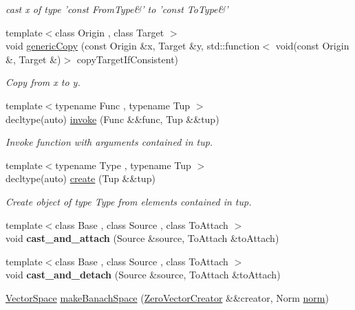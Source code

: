 \begin{DoxyCompactItemize}
\begin{DoxyCompactList}\small\item\em cast x of type 'const From\-Type\&' to 'const To\-Type\&' \end{DoxyCompactList}\item 
{\footnotesize template$<$class Origin , class Target $>$ }\\void \hyperlink{namespaceSpacy_a7dd8ce352c45e326cf8966befd5159ce}{generic\-Copy} (const Origin \&x, Target \&y, std\-::function$<$ void(const Origin \&, Target \&)$>$ copy\-Target\-If\-Consistent)
\begin{DoxyCompactList}\small\item\em Copy from x to y. \end{DoxyCompactList}\item 
{\footnotesize template$<$typename Func , typename Tup $>$ }\\decltype(auto) \hyperlink{namespaceSpacy_a64250818ba7ff711c207af6ab40ff986}{invoke} (Func \&\&func, Tup \&\&tup)
\begin{DoxyCompactList}\small\item\em Invoke function with arguments contained in tup. \end{DoxyCompactList}\item 
{\footnotesize template$<$typename Type , typename Tup $>$ }\\decltype(auto) \hyperlink{namespaceSpacy_ae823c82326475d3cc3b166533deddf21}{create} (Tup \&\&tup)
\begin{DoxyCompactList}\small\item\em Create object of type Type from elements contained in tup. \end{DoxyCompactList}\item 
\hypertarget{namespaceSpacy_a84ea9f9186cc834141aa9fa996521007}{{\footnotesize template$<$class Base , class Source , class To\-Attach $>$ }\\void {\bfseries cast\-\_\-and\-\_\-attach} (Source \&source, To\-Attach \&to\-Attach)}\label{namespaceSpacy_a84ea9f9186cc834141aa9fa996521007}

\item 
\hypertarget{namespaceSpacy_a8cb35e7115d5c299e260e7c196770df9}{{\footnotesize template$<$class Base , class Source , class To\-Attach $>$ }\\void {\bfseries cast\-\_\-and\-\_\-detach} (Source \&source, To\-Attach \&to\-Attach)}\label{namespaceSpacy_a8cb35e7115d5c299e260e7c196770df9}

\item 
\hypertarget{namespaceSpacy_a0b66c8f2345b693504180dc7fb187958}{\hyperlink{classSpacy_1_1VectorSpace}{Vector\-Space} \hyperlink{namespaceSpacy_a0b66c8f2345b693504180dc7fb187958}{make\-Banach\-Space} (\hyperlink{classSpacy_1_1ZeroVectorCreator}{Zero\-Vector\-Creator} \&\&creator, Norm \hyperlink{namespaceSpacy_a86a4fc266aa19a07b0af16388907354b}{norm})}\label{namespaceSpacy_a0b66c8f2345b693504180dc7fb187958}


\end{DoxyCompactItemize}
